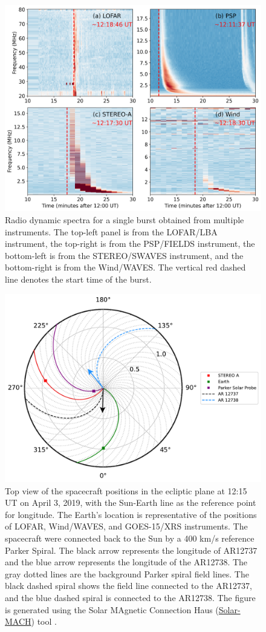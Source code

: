 \begin{figure}
\centering
\includegraphics[width=0.9\hsize]{chapter3/figs/all_dyspec.png}
\caption{Radio dynamic spectra for a single burst obtained from multiple instruments. The top-left panel is from the LOFAR/LBA instrument, the top-right is from the PSP/FIELDS instrument, the bottom-left is from the STEREO/SWAVES instrument, and the bottom-right is from the Wind/WAVES. The vertical red dashed line denotes the start time of the burst.}
\label{fig_alldyspec}
\end{figure}

\begin{figure}
\centering
\includegraphics[width=0.8\hsize]{chapter3/figs/solarMach.pdf}
  \caption{Top view of the spacecraft positions in the ecliptic plane at 12:15 UT on April 3, 2019, with the Sun-Earth line as the reference point for longitude. The Earth's location is representative of the positions of LOFAR, Wind/WAVES, and GOES-15/XRS instruments. The spacecraft were connected back to the Sun by a 400 km/s reference Parker Spiral. The black arrow represents the longitude of AR12737 and the blue arrow represents the longitude of the AR12738. The gray dotted lines are the background Parker spiral field lines. The black dashed spiral shows the field line connected to the AR12737, and the blue dashed spiral is connected to the AR12738. The figure is generated using the Solar MAgnetic Connection Haus (\href{https://github.com/jgieseler/solarmach}{Solar-MACH}) tool \citep{gieseler_2023}.}
     \label{locations}
\end{figure}

